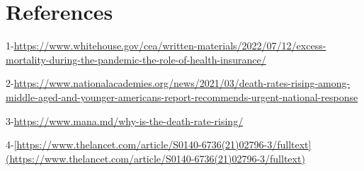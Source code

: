\documentclass[
  12pt,
]{article}
\newlength{\cslhangindent}
\newlength{\cslentryspacingunit} %
\newenvironment{CSLReferences}[2] %
 {%
  \setlength{\parindent}{0pt}
  \ifodd #1
  \let\oldpar\par
  \def\par{\hangindent=\cslhangindent\oldpar}
  \fi
  \setlength{\parskip}{#2\cslentryspacingunit}
 }%
 {}
\begin{document}
\newpage

\hypertarget{references}{%
\section{References}\label{references}}

\leavevmode{}%
\begin{CSLReferences}{0}{0}
1-\url{https://www.whitehouse.gov/cea/written-materials/2022/07/12/excess-mortality-during-the-pandemic-the-role-of-health-insurance/}

2-\url{https://www.nationalacademies.org/news/2021/03/death-rates-rising-among-middle-aged-and-younger-americans-report-recommends-urgent-national-response}

3-\url{https://www.mana.md/why-is-the-death-rate-rising/}

4-\href{https://www.thelancet.com/article/S0140-6736(21)02796-3/fulltext\%5D(https://www.thelancet.com/article/S0140-6736(21)02796-3/fulltext)}{{[}https://www.thelancet.com/article/S0140-6736(21)02796-3/fulltext{]}(https://www.thelancet.com/article/S0140-6736(21)02796-3/fulltext)}

\end{CSLReferences}
\end{document}
